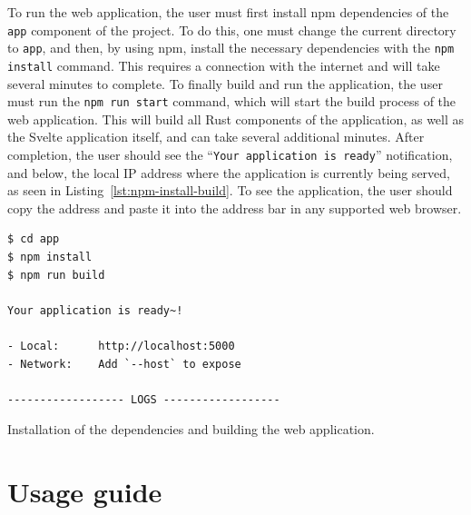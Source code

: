 \documentclass[english,bachelors,forcepolishlogotype]{wizthesis}
\begin{document}
To run the web application, the user must first install npm dependencies of the
\texttt{app} component of the project. To do this, one must change the current
directory to \texttt{app}, and then, by using npm, install the necessary
dependencies with the \texttt{npm install} command. This requires a connection
with the internet and will take several minutes to complete. To finally build
and run the application, the user must run the \texttt{npm run start} command,
which will start the build process of the web application. This will build all
Rust components of the application, as well as the Svelte application itself,
and can take several additional minutes. After completion, the user should see
the ``\texttt{Your application is ready}'' notification, and below, the local IP
address where the application is currently being served, as seen in
Listing~\ref{lst:npm-install-build}. To see the application, the user should
copy the address and paste it into the address bar in any supported web browser.
\begin{listing}[H]
  \begin{verbatim}
$ cd app
$ npm install
$ npm run build

Your application is ready~!

- Local:      http://localhost:5000
- Network:    Add `--host` to expose

------------------ LOGS ------------------
  \end{verbatim}
  \caption{Installation of the dependencies and building the web application.}
  \label{lst:npm-install-build}
\end{listing}

\section{Usage guide}
\end{document}
